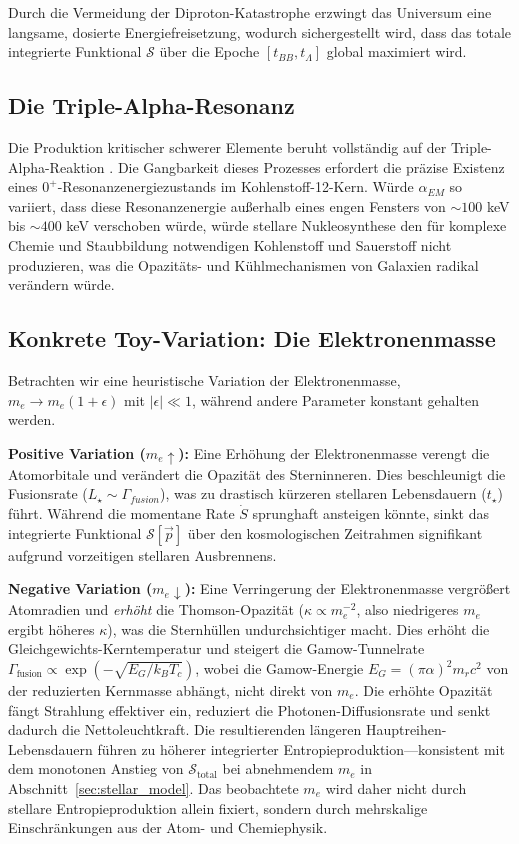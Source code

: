 \documentclass[12pt,a4paper]{article}
\theoremstyle{remark}
\begin{document}
Durch die Vermeidung der Diproton-Katastrophe erzwingt das Universum eine langsame, dosierte Energiefreisetzung, wodurch sichergestellt wird, dass das totale integrierte Funktional $\mathcal{S}$ \"uber die Epoche $[t_{BB}, t_\Lambda]$ global maximiert wird.

\subsection{Die Triple-Alpha-Resonanz}

Die Produktion kritischer schwerer Elemente beruht vollst\"andig auf der Triple-Alpha-Reaktion \citep{Adams2019}. Die Gangbarkeit dieses Prozesses erfordert die pr\"azise Existenz eines $0^+$-Resonanzenergiezustands im Kohlenstoff-12-Kern. W\"urde $\alpha_{EM}$ so variiert, dass diese Resonanzenergie au\ss{}erhalb eines engen Fensters von $\sim 100$ keV bis $\sim 400$ keV verschoben w\"urde, w\"urde stellare Nukleosynthese den f\"ur komplexe Chemie und Staubbildung notwendigen Kohlenstoff und Sauerstoff nicht produzieren, was die Opazit\"ats- und K\"uhlmechanismen von Galaxien radikal ver\"andern w\"urde.

\subsection{Konkrete Toy-Variation: Die Elektronenmasse}

Betrachten wir eine heuristische Variation der Elektronenmasse, $m_e \to m_e(1+\epsilon)$ mit $|\epsilon| \ll 1$, w\"ahrend andere Parameter konstant gehalten werden.

\textbf{Positive Variation ($m_e \uparrow$):} Eine Erh\"ohung der Elektronenmasse verengt die Atomorbitale und ver\"andert die Opazit\"at des Sterninneren. Dies beschleunigt die Fusionsrate ($L_\star \sim \Gamma_{fusion}$), was zu drastisch k\"urzeren stellaren Lebensdauern ($t_\star$) f\"uhrt. W\"ahrend die momentane Rate $\dot{S}$ sprunghaft ansteigen k\"onnte, sinkt das integrierte Funktional $\mathcal{S}[\vec{p}]$ \"uber den kosmologischen Zeitrahmen signifikant aufgrund vorzeitigen stellaren Ausbrennens.

\textbf{Negative Variation ($m_e \downarrow$):} Eine Verringerung der Elektronenmasse vergr\"o\ss{}ert Atomradien und \emph{erh\"oht} die Thomson-Opazit\"at ($\kappa \propto m_e^{-2}$, also niedrigeres $m_e$ ergibt h\"oheres $\kappa$), was die Sternh\"ullen undurchsichtiger macht. Dies erh\"oht die Gleichgewichts-Kerntemperatur und steigert die Gamow-Tunnelrate $\Gamma_{\text{fusion}} \propto \exp(-\sqrt{E_G / k_B T_c})$, wobei die Gamow-Energie $E_G = (\pi \alpha)^2 m_r c^2$ von der reduzierten Kernmasse abh\"angt, nicht direkt von $m_e$. Die erh\"ohte Opazit\"at f\"angt Strahlung effektiver ein, reduziert die Photonen-Diffusionsrate und senkt dadurch die Nettoleuchtkraft. Die resultierenden l\"angeren Hauptreihen-Lebensdauern f\"uhren zu h\"oherer integrierter Entropieproduktion---konsistent mit dem monotonen Anstieg von $\mathcal{S}_{\text{total}}$ bei abnehmendem $m_e$ in Abschnitt~\ref{sec:stellar_model}. Das beobachtete $m_e$ wird daher nicht durch stellare Entropieproduktion allein fixiert, sondern durch mehrskalige Einschr\"ankungen aus der Atom- und Chemiephysik.
\end{document}

